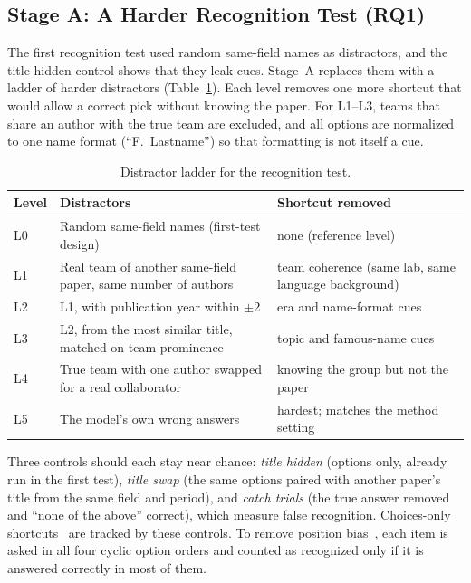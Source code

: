 \documentclass[sigconf,nonacm]{acmart}
\begin{document}
\subsection{Stage A: A Harder Recognition Test (RQ1)}

The first recognition test used random same-field names as distractors, and the title-hidden control shows that they leak cues. Stage~A replaces them with a ladder of harder distractors (Table~\ref{tab:ladder}). Each level removes one more shortcut that would allow a correct pick without knowing the paper. For L1--L3, teams that share an author with the true team are excluded, and all options are normalized to one name format (``F.~Lastname'') so that formatting is not itself a cue.

\begin{table}[t]
\caption{Distractor ladder for the recognition test.}
\label{tab:ladder}
\small
\begin{tabular}{@{}>{\raggedright\arraybackslash}p{0.75cm}>{\raggedright\arraybackslash}p{3.45cm}>{\raggedright\arraybackslash}p{3.0cm}@{}}
\toprule
Level & Distractors & Shortcut removed \\
\midrule
L0 & Random same-field names (first-test design) & none (reference level) \\
L1 & Real team of another same-field paper, same number of authors & team coherence (same lab, same language background) \\
L2 & L1, with publication year within $\pm$2 & era and name-format cues \\
L3 & L2, from the most similar title, matched on team prominence & topic and famous-name cues \\
L4 & True team with one author swapped for a real collaborator & knowing the group but not the paper \\
L5 & The model's own wrong answers & hardest; matches the method setting \\
\bottomrule
\end{tabular}
\end{table}

Three controls should each stay near chance: \emph{title hidden} (options only, already run in the first test), \emph{title swap} (the same options paired with another paper's title from the same field and period), and \emph{catch trials} (the true answer removed and ``none of the above'' correct), which measure false recognition. Choices-only shortcuts~\cite{balepur2024artifacts} are tracked by these controls. To remove position bias~\cite{zheng2024mcq}, each item is asked in all four cyclic option orders and counted as recognized only if it is answered correctly in most of them.
\end{document}
